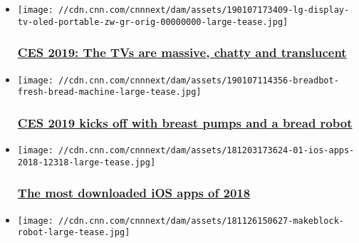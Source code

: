 \begin{itemize}
\item
  \href{/2019/01/08/tech/ces-2019-tv-trends/index.html}{}

  \texttt{[image: //cdn.cnn.com/cnnnext/dam/assets/190107173409-lg-display-tv-oled-portable-zw-gr-orig-00000000-large-tease.jpg]}

  \hypertarget{ces-2019-the-tvs-are-massive-chatty-and-translucent}{%
  \subsubsection{\texorpdfstring{\href{/2019/01/08/tech/ces-2019-tv-trends/index.html}{CES
  2019: The TVs are massive, chatty and
  translucent}}{CES 2019: The TVs are massive, chatty and translucent}}\label{ces-2019-the-tvs-are-massive-chatty-and-translucent}}
\item
  \href{/2019/01/07/tech/ces-2019-trends/index.html}{}

  \texttt{[image: //cdn.cnn.com/cnnnext/dam/assets/190107114356-breadbot-fresh-bread-machine-large-tease.jpg]}

  \hypertarget{ces-2019-kicks-off-with-breast-pumps-and-a-bread-robot}{%
  \subsubsection{\texorpdfstring{\href{/2019/01/07/tech/ces-2019-trends/index.html}{CES
  2019 kicks off with breast pumps and a bread
  robot}}{CES 2019 kicks off with breast pumps and a bread robot}}\label{ces-2019-kicks-off-with-breast-pumps-and-a-bread-robot}}
\item
  \href{/2018/12/04/tech/ios-most-popular-apps/index.html}{}

  \texttt{[image: //cdn.cnn.com/cnnnext/dam/assets/181203173624-01-ios-apps-2018-12318-large-tease.jpg]}

  \hypertarget{the-most-downloaded-ios-apps-of-2018}{%
  \subsubsection{\texorpdfstring{\href{/2018/12/04/tech/ios-most-popular-apps/index.html}{The
  most downloaded iOS apps of
  2018}}{The most downloaded iOS apps of 2018}}\label{the-most-downloaded-ios-apps-of-2018}}
\item
  \href{/videos/business/2018/11/26/shenzhen-china-makeblock.cnn-business}{}

  \texttt{[image: //cdn.cnn.com/cnnnext/dam/assets/181126150627-makeblock-robot-large-tease.jpg]}


\end{itemize}

